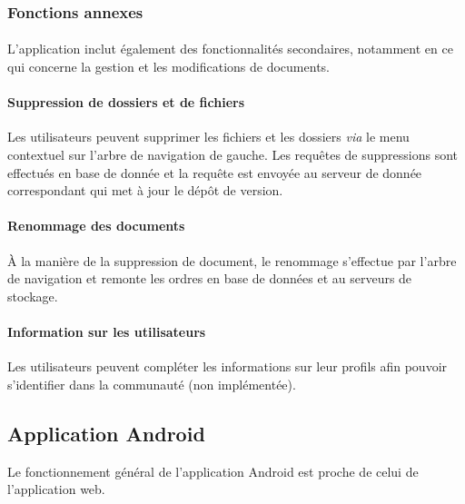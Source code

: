 \documentclass[a4paper,12pt]{article}
\begin{document}
\subsubsection{Fonctions annexes}
\paragraph*{}
L'application inclut également des fonctionnalités secondaires, notamment en ce qui concerne la gestion et les modifications de documents.

\paragraph{Suppression de dossiers et de fichiers\\}
Les utilisateurs peuvent supprimer les fichiers et les dossiers \emph{via} le menu contextuel sur l'arbre de navigation de gauche.
Les requêtes de suppressions sont effectués en base de donnée et la requête est envoyée au serveur de donnée correspondant qui met à jour le dépôt de version.

\paragraph{Renommage des documents\\}
\`A la manière de la suppression de document, le renommage s'effectue par l'arbre de navigation et remonte les ordres en base de données et au serveurs de stockage.

\paragraph{Information sur les utilisateurs\\}
Les utilisateurs peuvent compléter les informations sur leur profils afin pouvoir s'identifier dans la communauté (non implémentée).

\newpage
\subsection{Application Android}
Le fonctionnement général de l'application Android est proche de celui de l'application web.
\end{document}
